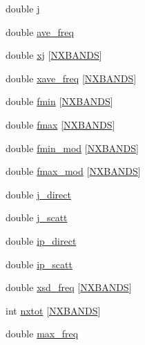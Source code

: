 \begin{DoxyCompactItemize}
\item 
double \hyperlink{structplasma_a81aa2849c8ad883b8b23ca7a5e7b7c2f}{j}
\item 
double \hyperlink{structplasma_a9ef4bb2909c072cb6155880d3114c95f}{ave\+\_\+freq}
\item 
double \hyperlink{structplasma_abded068048bfaf274478a65b26388ed5}{xj} \mbox{[}\hyperlink{python_8h_ac640b7fc429348ef2f6781704d3c5163}{N\+X\+B\+A\+N\+DS}\mbox{]}
\item 
double \hyperlink{structplasma_ae72cc720bc175444504be8f75d02e4c4}{xave\+\_\+freq} \mbox{[}\hyperlink{python_8h_ac640b7fc429348ef2f6781704d3c5163}{N\+X\+B\+A\+N\+DS}\mbox{]}
\item 
double \hyperlink{structplasma_ac4d25da8ffad12c810a2be5baf12c9a0}{fmin} \mbox{[}\hyperlink{python_8h_ac640b7fc429348ef2f6781704d3c5163}{N\+X\+B\+A\+N\+DS}\mbox{]}
\item 
double \hyperlink{structplasma_a21e7b17fa73a2521fe95247ac0d52d36}{fmax} \mbox{[}\hyperlink{python_8h_ac640b7fc429348ef2f6781704d3c5163}{N\+X\+B\+A\+N\+DS}\mbox{]}
\item 
double \hyperlink{structplasma_a79f84fac2bd8b8ee286bf33092531f18}{fmin\+\_\+mod} \mbox{[}\hyperlink{python_8h_ac640b7fc429348ef2f6781704d3c5163}{N\+X\+B\+A\+N\+DS}\mbox{]}
\item 
double \hyperlink{structplasma_ab5b2a9cf34eb1359961d6783a81ea266}{fmax\+\_\+mod} \mbox{[}\hyperlink{python_8h_ac640b7fc429348ef2f6781704d3c5163}{N\+X\+B\+A\+N\+DS}\mbox{]}
\item 
double \hyperlink{structplasma_a3a6771031add8ed4970ea0a051ae3751}{j\+\_\+direct}
\item 
double \hyperlink{structplasma_ab48f9178fc1c8be99c96d9a33d19f2a9}{j\+\_\+scatt}
\item 
double \hyperlink{structplasma_acf74d2b82ce1f94cd72b38b432f68774}{ip\+\_\+direct}
\item 
double \hyperlink{structplasma_ac2985029f1cc2e4bd9a511c7c4ff5db9}{ip\+\_\+scatt}
\item 
double \hyperlink{structplasma_af6eca6f64a123edc0389b42ace886569}{xsd\+\_\+freq} \mbox{[}\hyperlink{python_8h_ac640b7fc429348ef2f6781704d3c5163}{N\+X\+B\+A\+N\+DS}\mbox{]}
\item 
int \hyperlink{structplasma_a8f5a30977d126bd3ec95bb175056e9c2}{nxtot} \mbox{[}\hyperlink{python_8h_ac640b7fc429348ef2f6781704d3c5163}{N\+X\+B\+A\+N\+DS}\mbox{]}
\item 
double \hyperlink{structplasma_ac6f1afeb2ed92f59b12ca628a4e75eff}{max\+\_\+freq}
\item 

\end{DoxyCompactItemize}
